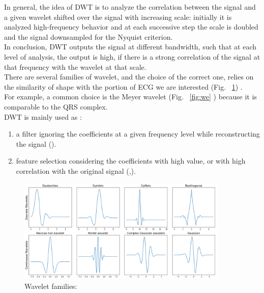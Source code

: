 \documentclass[LaM,binding=0.6cm]{sapthesis}
\begin{document}
In general, the idea of DWT is to analyze the correlation between the signal and a given wavelet shifted over the signal with increasing scale: initially it is analyzed high-frequency behavior and at each successive step the scale is doubled and the signal downsampled for the Nyquist criterion.\\In conclusion, DWT outputs the signal at different bandwidth, such that at each level of analysis, the output is high, if there is a strong correlation of the signal at that frequency with the wavelet at that scale.\\There are several families of wavelet, and the choice of the correct one, relies on the similarity of shape with the portion of ECG we are interested (Fig. ~\ref{fig:wf}) .\\For example, a common choice is the Meyer wavelet (Fig. ~\ref{fig:we} ) because it is comparable to the QRS complex.\\DWT is mainly used as :
\begin{enumerate}
\item a filter ignoring the coefficients at a given frequency level while reconstructing the signal (\cite{lnlf}).
\item feature selection considering the coefficients with high value, or with high correlation with the original signal (\cite{rfdwt},\cite{lnlf}).
\end{enumerate}
\begin{figure}[H]  \centering
    \includegraphics[width=100mm,scale=0.7]{waveletfamilies.png}
    \caption{Wavelet families: \cite{watut} }
    \label{fig:wf}
\end{figure}
\end{document}
